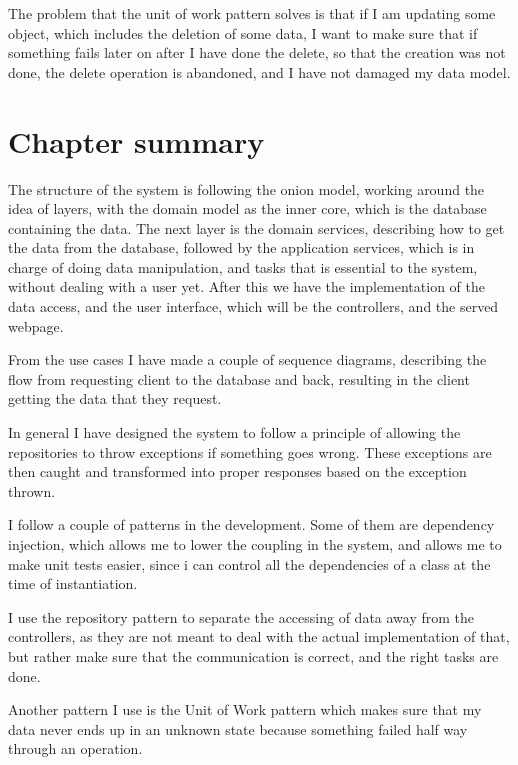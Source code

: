 The problem that the unit of work pattern solves is that if I am updating some
object, which includes the deletion of some data, I want to make sure that if
something fails later on after I have done the delete, so that the creation was
not done, the delete operation is abandoned, and I have not damaged my data
model\cite{uow}. 

\section{Chapter summary}
The structure of the system is following the onion model, working around the
idea of layers, with the domain model as the inner core, which is the database
containing the data. The next layer is the domain services, describing how to
get the data from the database, followed by the application services, which is
in charge of doing data manipulation, and tasks that is essential to the system,
without dealing with a user yet. After this we have the implementation of the
data access, and the user interface, which will be the controllers, and the
served webpage.

From the use cases I have made a couple of sequence diagrams, describing the flow
from requesting client to the database and back, resulting in the client
getting the data that they request. 

In general I have designed the system to follow a principle of allowing the
repositories to throw exceptions if something goes wrong. These exceptions are
then caught and transformed into proper responses based on the exception thrown.

I follow a couple of patterns in the development. Some of them are dependency
injection, which allows me to lower the coupling in the system, and allows me
to make unit tests easier, since i can control all the dependencies of a class
at the time of instantiation.

I use the repository pattern to separate the accessing of data away from the
controllers, as they are not meant to deal with the actual implementation of
that, but rather make sure that the communication is correct, and the right
tasks are done.

Another pattern I use is the Unit of Work pattern which makes sure that my data
never ends up in an unknown state because something failed half way through an
operation. 
